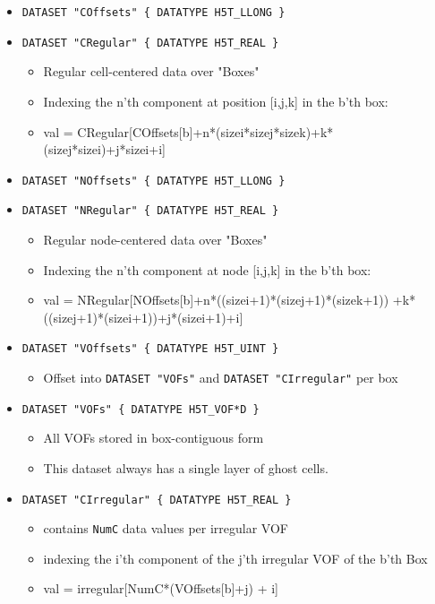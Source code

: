 \begin{itemize}
\item  {\tt DATASET "COffsets" \{ DATATYPE  H5T\_LLONG \} }
\item  {\tt DATASET "CRegular" \{ DATATYPE  H5T\_REAL \} } 
    \begin{itemize} 
        \item Regular cell-centered data over  "Boxes"
        \item Indexing the n'th component at position [i,j,k] in the b'th box:
        \item val = CRegular[COffsets[b]+n*(sizei*sizej*sizek)+k*(sizej*sizei)+j*sizei+i]
    \end{itemize}
\item  {\tt DATASET "NOffsets" \{ DATATYPE  H5T\_LLONG \} }
\item  {\tt DATASET "NRegular" \{ DATATYPE  H5T\_REAL \} } 
    \begin{itemize} 
        \item Regular node-centered data over  "Boxes"
        \item Indexing the n'th component at node [i,j,k] in the b'th box:
        \item val = NRegular[NOffsets[b]+n*((sizei+1)*(sizej+1)*(sizek+1))
                            +k*((sizej+1)*(sizei+1))+j*(sizei+1)+i]
    \end{itemize}
\item {\tt DATASET  "VOffsets" \{ DATATYPE  H5T\_UINT \} }
   \begin{itemize} \item  Offset into  {\tt DATASET  "VOFs"} and {\tt DATASET  "CIrregular"} 
                          per box 
    \end{itemize}

\item {\tt DATASET  "VOFs" \{ DATATYPE  H5T\_VOF*D \} }
    \begin{itemize} \item All VOFs stored in box-contiguous form
                    \item This dataset always has a single layer of ghost cells.
    \end{itemize}
\item {\tt DATASET  "CIrregular" \{ DATATYPE  H5T\_REAL \} }
    \begin{itemize} \item contains {\tt NumC} data values per irregular VOF
                    \item indexing the i'th component of the j'th irregular VOF of the b'th Box
                    \item val = irregular[NumC*(VOffsets[b]+j) + i] 
    \end{itemize}


\end{itemize}
